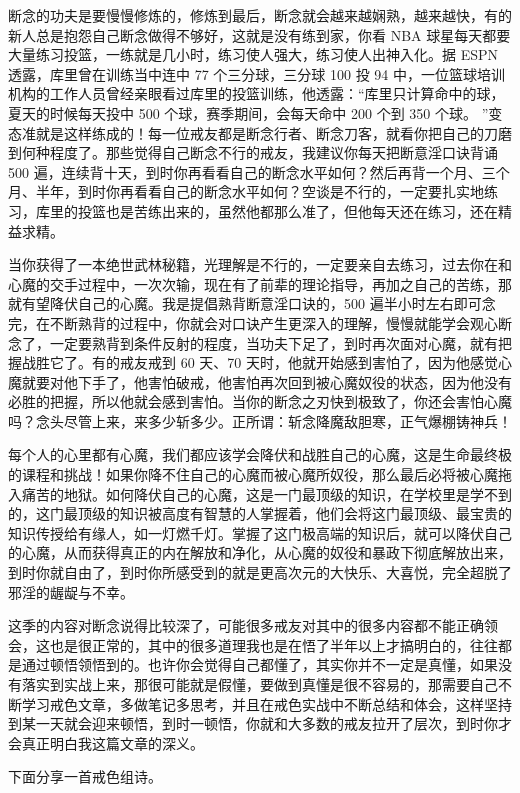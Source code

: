 断念的功夫是要慢慢修炼的，修炼到最后，断念就会越来越娴熟，越来越快，有的新人总是抱怨自己断念做得不够好，这就是没有练到家，你看 NBA 球星每天都要大量练习投篮，一练就是几小时，练习使人强大，练习使人出神入化。据 ESPN 透露，库里曾在训练当中连中 77 个三分球，三分球 100 投 94 中，一位篮球培训机构的工作人员曾经亲眼看过库里的投篮训练，他透露：“库里只计算命中的球，夏天的时候每天投中 500 个球，赛季期间，会每天命中 200 个到 350 个球。 ”变态准就是这样练成的！每一位戒友都是断念行者、断念刀客，就看你把自己的刀磨到何种程度了。那些觉得自己断念不行的戒友，我建议你每天把断意淫口诀背诵 500 遍，连续背十天，到时你再看看自己的断念水平如何？然后再背一个月、三个月、半年，到时你再看看自己的断念水平如何？空谈是不行的，一定要扎实地练习，库里的投篮也是苦练出来的，虽然他都那么准了，但他每天还在练习，还在精益求精。

当你获得了一本绝世武林秘籍，光理解是不行的，一定要亲自去练习，过去你在和心魔的交手过程中，一次次输，现在有了前辈的理论指导，再加之自己的苦练，那就有望降伏自己的心魔。我是提倡熟背断意淫口诀的，500 遍半小时左右即可念完，在不断熟背的过程中，你就会对口诀产生更深入的理解，慢慢就能学会观心断念了，一定要熟背到条件反射的程度，当功夫下足了，到时再次面对心魔，就有把握战胜它了。有的戒友戒到 60 天、70 天时，他就开始感到害怕了，因为他感觉心魔就要对他下手了，他害怕破戒，他害怕再次回到被心魔奴役的状态，因为他没有必胜的把握，所以他就会感到害怕。当你的断念之刃快到极致了，你还会害怕心魔吗？念头尽管上来，来多少斩多少。正所谓：斩念降魔敌胆寒，正气爆棚铸神兵！

每个人的心里都有心魔，我们都应该学会降伏和战胜自己的心魔，这是生命最终极的课程和挑战！如果你降不住自己的心魔而被心魔所奴役，那么最后必将被心魔拖入痛苦的地狱。如何降伏自己的心魔，这是一门最顶级的知识，在学校里是学不到的，这门最顶级的知识被高度有智慧的人掌握着，他们会将这门最顶级、最宝贵的知识传授给有缘人，如一灯燃千灯。掌握了这门极高端的知识后，就可以降伏自己的心魔，从而获得真正的内在解放和净化，从心魔的奴役和暴政下彻底解放出来，到时你就自由了，到时你所感受到的就是更高次元的大快乐、大喜悦，完全超脱了邪淫的龌龊与不幸。

这季的内容对断念说得比较深了，可能很多戒友对其中的很多内容都不能正确领会，这也是很正常的，其中的很多道理我也是在悟了半年以上才搞明白的，往往都是通过顿悟领悟到的。也许你会觉得自己都懂了，其实你并不一定是真懂，如果没有落实到实战上来，那很可能就是假懂，要做到真懂是很不容易的，那需要自己不断学习戒色文章，多做笔记多思考，并且在戒色实战中不断总结和体会，这样坚持到某一天就会迎来顿悟，到时一顿悟，你就和大多数的戒友拉开了层次，到时你才会真正明白我这篇文章的深义。

下面分享一首戒色组诗。

